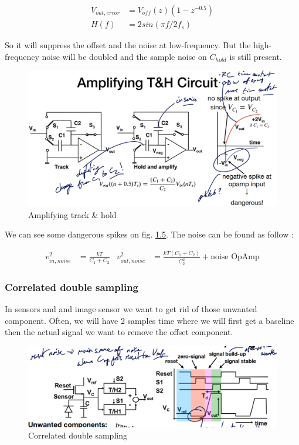 \documentclass[
  a4paper,
]{article}
\begin{document}
\[\begin{aligned}
    V_{out,error} &= V_{off} (z) (1-z^{-0.5})\\
    H(f) &= 2 sin(\pi f/2f_s)
\end{aligned}\]

So it will suppress the offset and the noise at low-frequency. But the
high-frequency noise will be doubled and the sample noise on
\(C_{hold}\) is still present.

\begin{figure}
\hypertarget{fig:amplifying-th-label}{%
\centering
\includegraphics{img/Amplifying_Track.png}
\caption{Amplifying track \& hold}\label{fig:amplifying-th-label}
}
\end{figure}

We can see some dangerous spikes on fig.
\protect\hyperlink{fig:amplifying-th-label}{1.5}. The noise can be found
as follow :

\[\begin{aligned}
    v_{in,noise}^2 &= \frac{kT}{C_1+C_2} & v_{out,noise}^2 &= \frac{kT(C_1+C_2)}{C_2^2} + \text{noise OpAmp}
\end{aligned}\]

\hypertarget{correlated-double-sampling}{%
\subsubsection{Correlated double
sampling}\label{correlated-double-sampling}}

In sensors and and image sensor we want to get rid of those unwanted
component. Often, we will have 2 samples time where we will first get a
baseline then the actual signal we want to remove the offset component.

\begin{figure}
\hypertarget{fig:double-correlated-label}{%
\centering
\includegraphics{img/double_corr.png}
\caption{Correlated double sampling}\label{fig:double-correlated-label}
}
\end{figure}
\end{document}
